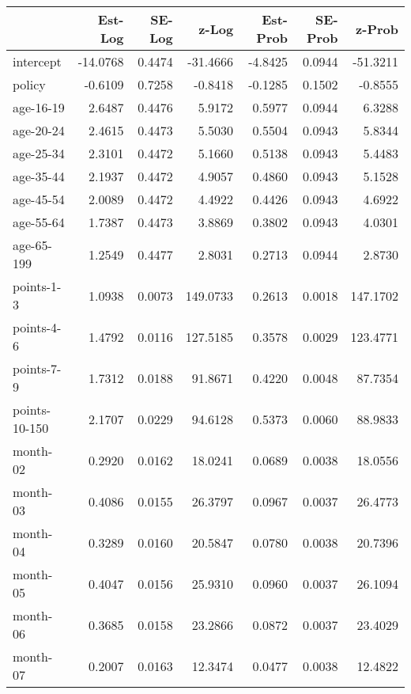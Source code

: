 \documentclass[10pt]{article}
\begin{document}
\clearpage
\pagebreak




\begin{table}[ht]
\centering
\begin{tabular}{lrrrrrr}
  \hline
 & Est-Log & SE-Log & z-Log & Est-Prob & SE-Prob & z-Prob \\ 
  \hline
intercept & -14.0768 & 0.4474 & -31.4666 & -4.8425 & 0.0944 & -51.3211 \\ 
  policy & -0.6109 & 0.7258 & -0.8418 & -0.1285 & 0.1502 & -0.8555 \\ 
  age-16-19 & 2.6487 & 0.4476 & 5.9172 & 0.5977 & 0.0944 & 6.3288 \\ 
  age-20-24 & 2.4615 & 0.4473 & 5.5030 & 0.5504 & 0.0943 & 5.8344 \\ 
  age-25-34 & 2.3101 & 0.4472 & 5.1660 & 0.5138 & 0.0943 & 5.4483 \\ 
  age-35-44 & 2.1937 & 0.4472 & 4.9057 & 0.4860 & 0.0943 & 5.1528 \\ 
  age-45-54 & 2.0089 & 0.4472 & 4.4922 & 0.4426 & 0.0943 & 4.6922 \\ 
  age-55-64 & 1.7387 & 0.4473 & 3.8869 & 0.3802 & 0.0943 & 4.0301 \\ 
  age-65-199 & 1.2549 & 0.4477 & 2.8031 & 0.2713 & 0.0944 & 2.8730 \\ 
  points-1-3 & 1.0938 & 0.0073 & 149.0733 & 0.2613 & 0.0018 & 147.1702 \\ 
  points-4-6 & 1.4792 & 0.0116 & 127.5185 & 0.3578 & 0.0029 & 123.4771 \\ 
  points-7-9 & 1.7312 & 0.0188 & 91.8671 & 0.4220 & 0.0048 & 87.7354 \\ 
  points-10-150 & 2.1707 & 0.0229 & 94.6128 & 0.5373 & 0.0060 & 88.9833 \\ 
  month-02 & 0.2920 & 0.0162 & 18.0241 & 0.0689 & 0.0038 & 18.0556 \\ 
  month-03 & 0.4086 & 0.0155 & 26.3797 & 0.0967 & 0.0037 & 26.4773 \\ 
  month-04 & 0.3289 & 0.0160 & 20.5847 & 0.0780 & 0.0038 & 20.7396 \\ 
  month-05 & 0.4047 & 0.0156 & 25.9310 & 0.0960 & 0.0037 & 26.1094 \\ 
  month-06 & 0.3685 & 0.0158 & 23.2866 & 0.0872 & 0.0037 & 23.4029 \\ 
  month-07 & 0.2007 & 0.0163 & 12.3474 & 0.0477 & 0.0038 & 12.4822 \\ 

\end{tabular}
\end{table}
\end{document}
